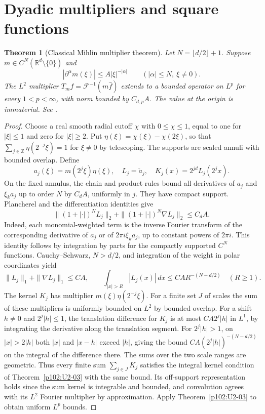 \documentclass[11pt,oneside,openany]{book}
\newtheorem{theorem}{Theorem}[chapter]
\theoremstyle{definition}
\theoremstyle{remark}
\begin{document}
\section{Dyadic multipliers and square functions}

\begin{theorem}[Classical Mihlin multiplier theorem]
\label{p102:U3-05}
Let \(N=\lfloor d/2\rfloor+1\). Suppose \(m\in C^N(\mathbb R^d\setminus\{0\})\) and
\[
 |\partial^\alpha m(\xi)|\le A|\xi|^{-|\alpha|}
 \qquad (|\alpha|\le N,\ \xi\ne0).
\]
The \(L^2\) multiplier \(T_m f=\mathcal F^{-1}(m\widehat f)\) extends to a bounded operator on \(L^p\) for every \(1<p<\infty\), with norm bounded by \(C_{d,p}A\). The value at the origin is immaterial. See \cite[\S6.2.3]{grafakos}.
\end{theorem}
\begin{proof}
Choose a real smooth radial cutoff \(\chi\) with \(0\le\chi\le1\), equal to one for \(|\xi|\le1\) and zero for \(|\xi|\ge2\). Put \(\eta(\xi)=\chi(\xi)-\chi(2\xi)\), so that \(\sum_{j\in\mathbb Z}\eta(2^{-j}\xi)=1\) for \(\xi\ne0\) by telescoping. The supports are scaled annuli with bounded overlap. Define
\[
 a_j(\xi)=m(2^j\xi)\eta(\xi),\quad L_j=\check a_j,\quad K_j(x)=2^{jd}L_j(2^j x).
\]
On the fixed annulus, the chain and product rules bound all derivatives of \(a_j\) and \(\xi_k a_j\) up to order \(N\) by \(C_dA\), uniformly in \(j\). They have compact support. Plancherel and the differentiation identities give
\[
 \|(1+|\cdot|)^N L_j\|_2+
 \|(1+|\cdot|)^N\nabla L_j\|_2\le C_d A .
\]
Indeed, each monomial-weighted term is the inverse Fourier transform of the corresponding derivative of \(a_j\) or of \(2\pi i\xi_k a_j\), up to constant powers of \(2\pi i\). This identity follows by integration by parts for the compactly supported \(C^N\) functions. Cauchy--Schwarz, \(N>d/2\), and integration of the weight in polar coordinates yield
\[
 \|L_j\|_1+\|\nabla L_j\|_1\le C A,\qquad
 \int_{|x|>R}|L_j(x)|\,dx\le C A R^{-(N-d/2)}
 \quad(R\ge1).
\]
The kernel \(K_j\) has multiplier \(m(\xi)\eta(2^{-j}\xi)\). For a finite set \(J\) of scales the sum of these multipliers is uniformly bounded on \(L^2\) by bounded overlap. For a shift \(h\ne0\) and \(2^j|h|\le1\), the translation difference for \(K_j\) is at most \(C A 2^j|h|\) in \(L^1\), by integrating the derivative along the translation segment. For \(2^j|h|>1\), on \(|x|>2|h|\) both \(|x|\) and \(|x-h|\) exceed \(|h|\), giving the bound \(C A(2^j|h|)^{-(N-d/2)}\) on the integral of the difference there. The sums over the two scale ranges are geometric. Thus every finite sum \(\sum_{j\in J}K_j\) satisfies the integral kernel condition of Theorem~\ref{p102:U2-03} with the same bound. Its off-support representation holds since the sum kernel is integrable and bounded, and convolution agrees with its \(L^2\) Fourier multiplier by approximation. Apply Theorem~\ref{p102:U2-03} to obtain uniform \(L^p\) bounds.


\end{proof}
\end{document}
